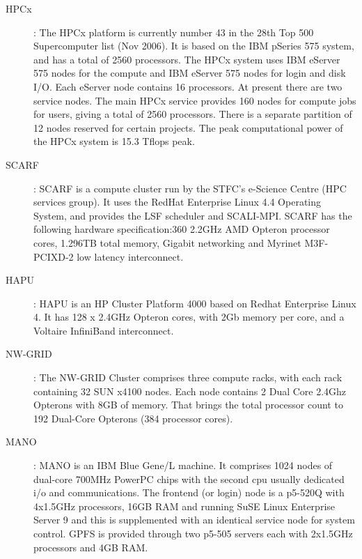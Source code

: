 \begin{description}
\item[HPCx]: The HPCx platform is currently number 43 in the 28th Top 500 Supercomputer list (Nov 2006). It is based on the IBM pSeries 575 system, and has a total of 2560 processors. The HPCx system uses IBM eServer 575 nodes for the compute and IBM eServer 575 nodes for login and disk I/O. Each eServer node contains 16 processors. At present there are two service nodes. The main HPCx service provides 160 nodes for compute jobs for users, giving a total of 2560 processors. There is a separate partition of 12 nodes reserved for certain projects. The peak computational power of the HPCx system is 15.3 Tflops peak.
\item[SCARF]: SCARF is a compute cluster run by the STFC's e-Science Centre (HPC services group). It uses the RedHat Enterprise Linux 4.4 Operating System, and provides the LSF scheduler and SCALI-MPI. SCARF has the following hardware specification:360 2.2GHz AMD Opteron processor cores, 1.296TB total memory, Gigabit networking and Myrinet M3F-PCIXD-2 low latency interconnect.
\item[HAPU]: HAPU is an HP Cluster Platform 4000 based on Redhat Enterprise Linux 4. It has 128 x 2.4GHz Opteron cores, with 2Gb memory per core, and a Voltaire InfiniBand interconnect.
\item[NW-GRID]: The NW-GRID Cluster comprises three compute racks, with each rack containing 32 SUN x4100 nodes. Each node contains 2 Dual Core 2.4Ghz Opterons with 8GB of memory. That brings the total processor count to 192 Dual-Core Opterons (384 processor cores). 
\item[MANO]: MANO is an IBM Blue Gene/L machine. It comprises 1024 nodes of dual-core 700MHz PowerPC chips with the second cpu usually dedicated i/o and communications. The frontend (or login) node is a p5-520Q with 4x1.5GHz processors, 16GB RAM and running SuSE Linux Enterprise Server 9 and this is supplemented with an identical service node for system control. GPFS is provided through two p5-505 servers each with 2x1.5GHz processors and 4GB RAM. 
\end{description}